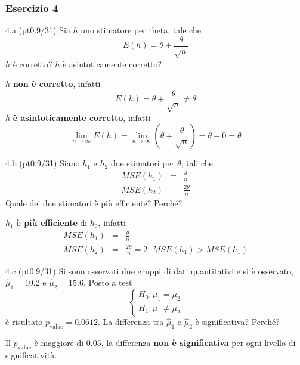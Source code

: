 \documentclass[
  10pt,
]{article}
\begin{document}
\subsubsection{Esercizio 4}\label{esercizio-4}

4.a (pt\hspace{.1em}0.9/31) Sia \(h\) uno stimatore per theta, tale che
\[
E(h)=\theta+\frac\theta {\sqrt{ n}}
\]
\(h\) è corretto? \(h\) è asintoticamente corretto?

\begin{sol}
\(h\) \textbf{non è corretto}, infatti
\[
E(h)=\theta+\frac\theta {\sqrt{ n}}\neq\theta
\]
\(h\) \textbf{è asintoticamente corretto}, infatti
\[
\lim_{n\to\infty}E(h)=\lim_{n\to\infty}\left(\theta+\frac\theta {\sqrt{ n}}\right)=\theta+0=\theta
\]

\end{sol}

4.b (pt\hspace{.1em}0.9/31) Siano \(h_1\) e \(h_2\) due stimatori per \(\theta\), tali che:
\begin{eqnarray*}
MSE(h_1) &=&   \frac\theta n\\
MSE(h_2) &=&   \frac{2\theta} n
\end{eqnarray*}
Quale dei due stimatori è più efficiente? Perché?

\begin{sol}
\(h_1\) \textbf{è più efficiente} di \(h_2\), infatti
\begin{eqnarray*}
MSE(h_1) &=&   \frac\theta n\\
MSE(h_2) &=&   \frac{2\theta} n =2\cdot MSE(h_1)>MSE(h_1)
\end{eqnarray*}

\end{sol}

4.c (pt\hspace{.1em}0.9/31) Si sono osservati due gruppi di dati quantitativi e si è osservato, \(\hat\mu_1=10.2\) e \(\hat\mu_2=15.6\). Posto a test
\[
\begin{cases}
H_0:\mu_1=\mu_2\\
H_1:\mu_1\ne \mu_2
\end{cases}
\]
è risultato \(p_\text{value}=0.0612\). La differenza tra \(\hat\mu_1\) e \(\hat\mu_2\) è significativa? Perché?

\begin{sol}
Il \(p_\text{value}\) è maggiore di 0.05, la differenza \textbf{non è significativa} per ogni livello di significatività.

\end{sol}
\end{document}
